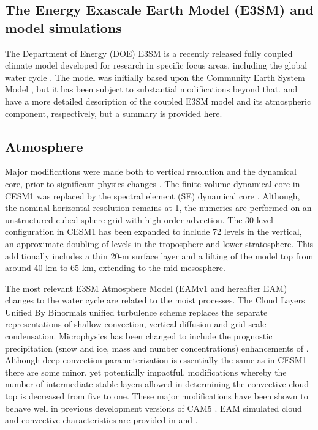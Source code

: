 \documentclass[draft,ms]{AGUTeX}
\begin{document}
\begin{article}
\section{The Energy Exascale Earth Model (E3SM) and model simulations}
\label{sec:model} The Department of Energy (DOE) E3SM is a recently released fully coupled climate model developed for research in specific focus areas, including the global water cycle \citep{Golaz2019}. The model was initially based upon the Community Earth System Model \citep[CESM1,][]{CESM1}, but it has been subject to substantial modifications beyond that. \cite{Golaz2019} and \cite{Xie2018} have a more detailed description of the coupled E3SM model and its atmospheric component, respectively, but a summary is provided here.
\subsection{Atmosphere}
Major modifications were made both to vertical resolution and the dynamical core, prior to significant physics changes \citep{Xie2018}. The finite volume dynamical core in CESM1 \citep{Lin2006,Lin1996} was replaced by the spectral element (SE) dynamical core \citep{Taylor2008}. Although, the nominal horizontal resolution remains at 1\deg, the numerics are performed on an unstructured cubed sphere grid with high-order advection. The 30-level configuration in CESM1 has been expanded to include 72 levels in the vertical, an approximate doubling of levels in the troposphere and lower stratosphere. This additionally includes a thin 20-m surface layer and a lifting of the model top from around 40 km to 65 km, extending to the mid-mesosphere.

The most relevant E3SM Atmosphere Model (EAMv1 and hereafter EAM) changes to the water cycle are related to the moist processes. The Cloud Layers Unified By Binormals \citep[CLUBB,][]{Golaz2002} unified turbulence scheme replaces the separate representations of shallow convection, vertical diffusion and grid-scale condensation. Microphysics has been changed to include the prognostic precipitation (snow and ice, mass and number concentrations) enhancements of \cite{Gettelman2015}. Although deep convection parameterization is essentially the same as in CESM1 there are some minor, yet potentially impactful, modifications whereby the number of intermediate stable layers allowed in determining the convective cloud top is decreased from five to one. These major modifications have been shown to behave well in previous development versions of CAM5 \citep{Bogenschutz2018}. EAM simulated cloud and convective characteristics are provided in \cite{Xie2018} and \cite{Zhang2019}. 


\end{article}
\end{document}
